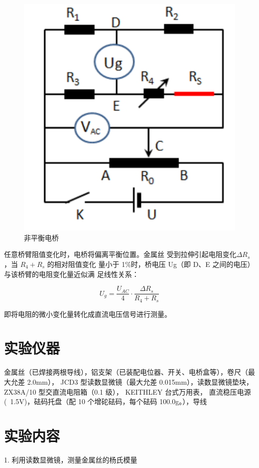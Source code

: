 \documentclass[a4paper,UTF8]{ctexart}
\begin{document}
\begin{figure}[!hp]
    \centering
    \includegraphics[scale=0.7]{static/fig1.png}
    \caption{非平衡电桥}
\end{figure}

任意桥臂阻值变化时，电桥将偏离平衡位置。金属丝
受到拉伸引起电阻变化$\Delta R_s$，当 $R_4+R_s$ 的相对阻值变化
量小于 1\%时，桥电压 Ug（即 D、E 之间的电压）与该桥臂的电阻变化量近似满
足线性关系：

\begin{equation}
    U_g = \frac{U_{AC}}{4}\cdot \frac{\Delta R_s}{R_4+R_s}
\end{equation}

即将电阻的微小变化量转化成直流电压信号进行测量。

\section{实验仪器}
金属丝（已焊接两根导线），铝支架（已装配电位器、开关、电桥盒等），卷尺（最大允差 2.0mm），
JCD3 型读数显微镜（最大允差 0.015mm），读数显微镜垫块，ZX38A/10 型交直流电阻箱（0.1 级），
KEITHLEY 台式万用表，
直流稳压电源(~1.5V)，砝码托盘（配 10 个增砣砝码，每个砝码 100.0g。），导线
\section{实验内容}

1. 利用读数显微镜，测量金属丝的杨氏模量
\end{document}
